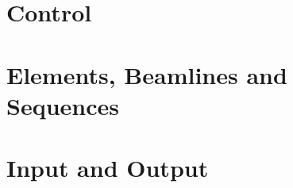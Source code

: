 \documentclass[11pt,a4paper,twoside]{report}
\begin{document}

\tableofcontents
\newpage


\listoftables
\listoffigures

\part{Control}


\part{Elements, Beamlines and Sequences}

\part{Input and Output}                 
			
\end{document}
